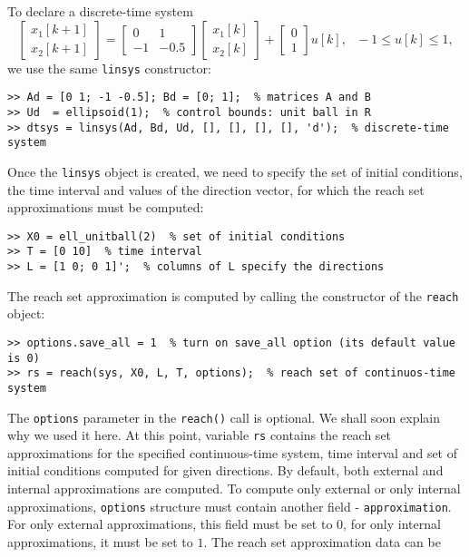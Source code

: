 To declare a discrete-time system
\[ \left[\begin{array}{c}
x_1[k+1]\\
x_2[k+1]\end{array}\right] = \left[\begin{array}{cc}
0 & 1\\
-1 & -0.5\end{array}\right]\left[\begin{array}{c}
x_1[k]\\
x_2[k]\end{array}\right] + \left[\begin{array}{c}
0\\
1\end{array}\right]u[k], ~~~ -1\leq u[k]\leq 1,\]
we use the same {\tt linsys} constructor:
{\tt \begin{verbatim}
>> Ad = [0 1; -1 -0.5]; Bd = [0; 1];  % matrices A and B
>> Ud  = ellipsoid(1);  % control bounds: unit ball in R
>> dtsys = linsys(Ad, Bd, Ud, [], [], [], [], 'd');  % discrete-time system
\end{verbatim} }
Once the {\tt linsys} object is created, we need to specify the set
of initial conditions, the time interval and values of the direction vector,
for which the reach set approximations must be computed:
{\tt \begin{verbatim}
>> X0 = ell_unitball(2)  % set of initial conditions
>> T = [0 10]  % time interval
>> L = [1 0; 0 1]';  % columns of L specify the directions
\end{verbatim} }
The reach set approximation is computed by calling the constructor
of the {\tt reach} object:
{\tt \begin{verbatim}
>> options.save_all = 1  % turn on save_all option (its default value is 0)
>> rs = reach(sys, X0, L, T, options);  % reach set of continuos-time system
\end{verbatim} }
The {\tt options} parameter in the {\tt reach()} call is optional.
We shall soon explain why we used it here.
At this point, variable {\tt rs} contains the reach set approximations for the
specified continuous-time system, time interval and set of initial conditions
computed for given directions. By default, both external and internal
approximations are computed. To compute only external or only internal
approximations, {\tt options} structure must contain
another field - {\tt approximation}.
For only external approximations, this field
must be set to $0$, for only internal approximations, it must be set to $1$.
The reach set approximation data can be
